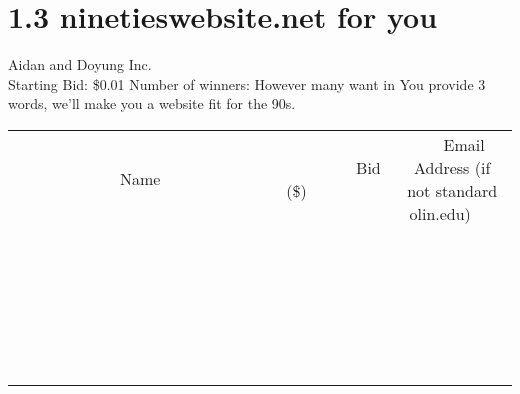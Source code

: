 \documentclass[11pt]{article}
\begin{document}
\section*{1.3 ninetieswebsite.net for you}
Aidan and Doyung Inc.
\\
Starting Bid: \$0.01
\newline
Number of winners: However many want in
\newline
You provide 3 words, we'll make you a website fit for the 90s.
\\[6ex]
\begin{tabular}{c c c}
~~~~~~~~~~~~~Name~~~~~~~~~~~~~ & ~~~~~~~~~Bid (\$)~~~~~~~~~  & ~~~Email Address (if not standard olin.edu)~~~\\
 & & \\
\hline
 & & \\
\hline
 & & \\
\hline
 & & \\
\hline
 & & \\
\hline
 & & \\
\hline
 & & \\
\hline
 & & \\
\hline
 & & \\
\hline
 & & \\
\hline
 & & \\
\hline
 & & \\
\hline
 & & \\
\hline
 & & \\
\hline
 & & \\
\hline
 & & \\
\hline
 & & \\
\hline
 & & \\
\hline
 & & \\
\hline
 & & \\
\hline
 & & \\
\hline
 & & \\
\hline
 & & \\
\hline
 & & \\
\hline
 & & \\
\hline
 & & \\
\hline
\end{tabular}
\newpage
\end{document}
